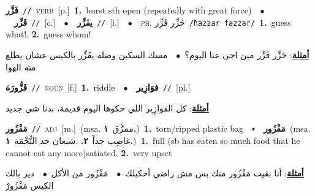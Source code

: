 \documentclass[10pt,a4paper,twoside]{article} %
\begin{document}
\begin{multicols}{2}
{\setlength\topsep{0pt}\textbf{\foreignlanguage{arabic}{فَزَّر}}\ {\color{gray}\texttt{//}\color{black}}\ \textsc{verb}\ [p.]\ \textbf{1.}~burst sth open (repeatedly with great force)\ \ $\bullet$\ \ \setlength\topsep{0pt}\textbf{\foreignlanguage{arabic}{فَزِّر}}\ {\color{gray}\texttt{//}\color{black}}\ [c.]\ \ $\bullet$\ \ \setlength\topsep{0pt}\textbf{\foreignlanguage{arabic}{يفَزِّر}}\ {\color{gray}\texttt{//}\color{black}}\ [i.]\ \ $\bullet$\ \ \textsc{ph.} \color{gray} \foreignlanguage{arabic}{حَزِّر فَزِّر}\color{black}\ {\color{gray}\texttt{/{\sffamily ħazzar fazzar}/}\color{black}}\ \textbf{1.}~guess what!.  \textbf{2.}~guess whom!\  \begin{flushright}\color{gray}\foreignlanguage{arabic}{\textbf{\underline{\foreignlanguage{arabic}{أمثلة}}}: حَزِّر فَزِّر مين اجى عنا اليوم؟\ $\bullet$\ \  مسك السكين وضله يفَزِّر بالكيس عشان يطلع منه الهوا}\end{flushright}\color{black}} \vspace{2mm}

{\setlength\topsep{0pt}\textbf{\foreignlanguage{arabic}{فَزُّورَة}}\ {\color{gray}\texttt{//}\color{black}}\ \textsc{noun}\ [f.]\ \textbf{1.}~riddle\ \ $\bullet$\ \ \setlength\topsep{0pt}\textbf{\foreignlanguage{arabic}{فوَازِير}}\ {\color{gray}\texttt{//}\color{black}}\ [pl.]\  \begin{flushright}\color{gray}\foreignlanguage{arabic}{\textbf{\underline{\foreignlanguage{arabic}{أمثلة}}}: كل الفوازِير اللي حكوها اليوم قديمة، بدنا شي جديد}\end{flushright}\color{black}} \vspace{2mm}

{\setlength\topsep{0pt}\textbf{\foreignlanguage{arabic}{مَفْزُور}}\ {\color{gray}\texttt{//}\color{black}}\ \textsc{adj}\ [m.]\ \color{gray}(msa. \foreignlanguage{arabic}{ممزَّق}~\foreignlanguage{arabic}{\textbf{١.}})\color{black}\ \textbf{1.}~torn/ripped plastic bag\ \ $\smblkdiamond$\ \ \setlength\topsep{0pt}\textbf{\foreignlanguage{arabic}{مَفْزُور}}\ \color{gray}(msa. \foreignlanguage{arabic}{غاضِب جداً}~\foreignlanguage{arabic}{\textbf{٢.}}  .\foreignlanguage{arabic}{شبعان حد التُّخْمَة}~\foreignlanguage{arabic}{\textbf{١.}})\color{black}\ \textbf{1.}~full (sb has eaten so much food that he cannot eat any more)satiated.  \textbf{2.}~very upset\  \begin{flushright}\color{gray}\foreignlanguage{arabic}{\textbf{\underline{\foreignlanguage{arabic}{أمثلة}}}: أنا بقيت مَفْزُور منك بس مش راضي أحكيلك\ $\bullet$\ \  مَفْزُور من الأكل\ $\bullet$\ \  دير بالك الكيس مَفْزُورْ}\end{flushright}\color{black}} \vspace{2mm}


\end{multicols}
\end{document}
